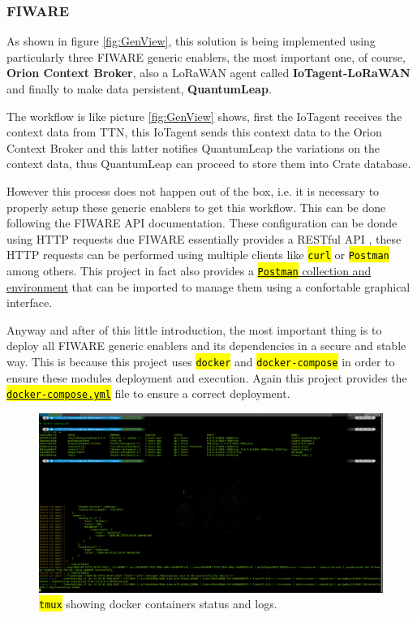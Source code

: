 \documentclass[11pt,a4paper,dvipsnames,twoside]{article}
\newcommand{\cmd}[1] {\hl{\texttt{#1}}}
\begin{document}
\subsubsection{FIWARE}
As shown in figure \ref{fig:GenView}, this solution is being implemented using particularly three FIWARE generic enablers, the most important one, of course, \textbf{Orion Context Broker}, also a LoRaWAN agent called \textbf{IoTagent-LoRaWAN} and finally to make data persistent, \textbf{QuantumLeap}.

The workflow is like picture \ref{fig:GenView} shows, first the IoTagent receives the context data from TTN, this IoTagent sends this context data to the Orion Context Broker and this latter notifies QuantumLeap the variations on the context data, thus QuantumLeap can proceed to store them into Crate database.

However this process does not happen out of the box, i.e. it is necessary to properly setup these generic enablers to get this workflow. This can be done following the FIWARE API documentation. These configuration can be donde using HTTP requests due FIWARE essentially provides a RESTful API \cite{FIWARE_RESTful}, these HTTP requests can be performed using multiple clients like \cmd{curl} or \cmd{Postman} among others. This project in fact also provides a \href{https://github.com/WyRe/lora-arduino-dendrometer/tree/master/src/postman}{\cmd{Postman} collection and environment} that can be imported to manage them using a confortable graphical interface.

Anyway and after of this little introduction, the most important thing is to deploy all FIWARE generic enablers and its dependencies in a secure and stable way. This is because this project uses \cmd{docker} and \cmd{docker-compose} in order to ensure these modules deployment and execution. Again this project provides the \href{https://github.com/WyRe/lora-arduino-dendrometer/blob/master/src/fiware/docker-compose.yml}{\cmd{docker-compose.yml}} file to ensure a correct deployment. 

\begin{figure}[ht]
  \centering
  \includegraphics[width=.9\textwidth]{../pictures/docker_containers_deployed.png}  
  \caption{\cmd{tmux} showing docker containers status and logs.}
  \label{fig:docker_containers}
\end{figure}
\end{document}
